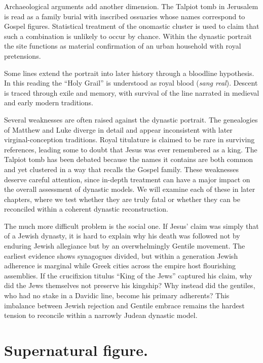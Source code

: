 Archaeological arguments add another dimension.
The Talpiot tomb in Jerusalem is read as a family burial with inscribed ossuaries whose names correspond to Gospel figures.
Statistical treatment of the onomastic cluster is used to claim that such a combination is unlikely to occur by chance.
Within the dynastic portrait the site functions as material confirmation of an urban household with royal pretensions.

Some lines extend the portrait into later history through a bloodline hypothesis.
In this reading the ``Holy Grail'' is understood as royal blood (\emph{sang real}).
Descent is traced through exile and memory, with survival of the line narrated in medieval and early modern traditions.

Several weaknesses are often raised against the dynastic portrait.
The genealogies of Matthew and Luke diverge in detail and appear inconsistent with later virginal-conception traditions.
Royal titulature is claimed to be rare in surviving references, leading some to doubt that Jesus was ever remembered as a king.
The Talpiot tomb has been debated because the names it contains are both common and yet clustered in a way that recalls the Gospel family.
These weaknesses deserve careful attention, since in-depth treatment can have a major impact on the overall assessment of dynastic models.
We will examine each of these in later chapters, where we test whether they are truly fatal or whether they can be reconciled within a coherent dynastic reconstruction.

The much more difficult problem is the social one.
If Jesus’ claim was simply that of a Jewish dynasty, it is hard to explain why his death was followed not by enduring Jewish allegiance but by an overwhelmingly Gentile movement.
The earliest evidence shows synagogues divided, but within a generation Jewish adherence is marginal while Greek cities across the empire host flourishing assemblies.
If the crucifixion titulus “King of the Jews” captured his claim, why did the Jews themselves not preserve his kingship?
Why instead did the gentiles, who had no stake in a Davidic line, become his primary adherents?
This imbalance between Jewish rejection and Gentile embrace remains the hardest tension to reconcile within a narrowly Judean dynastic model.

\section{Supernatural figure.}\label{sec:supernatural}

